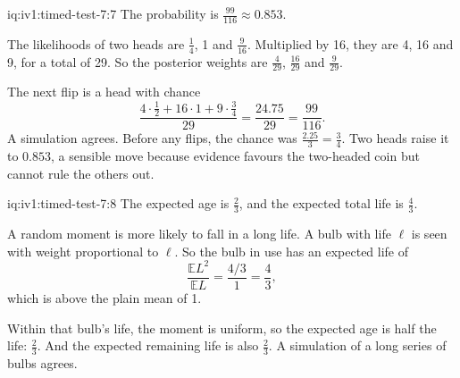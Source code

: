 \begin{solution}{iq:iv1:timed-test-7:7}
The probability is $\frac{99}{116} \approx 0.853$.

The likelihoods of two heads are $\frac14$, 1 and $\frac{9}{16}$. Multiplied by 16, they are 4, 16 and 9, for a total of 29. So the posterior weights are $\frac{4}{29}$, $\frac{16}{29}$ and $\frac{9}{29}$.

The next flip is a head with chance
\[
\frac{4 \cdot \frac12 + 16 \cdot 1 + 9 \cdot \frac34}{29} = \frac{24.75}{29} = \frac{99}{116}.
\]
A simulation agrees. Before any flips, the chance was $\frac{2.25}{3} = \frac34$. Two heads raise it to $0.853$, a sensible move because evidence favours the two-headed coin but cannot rule the others out.


\end{solution}

\enlargethispage{-4\baselineskip}%
\begin{solution}{iq:iv1:timed-test-7:8}
The expected age is $\frac23$, and the expected total life is $\frac43$.

A random moment is more likely to fall in a long life. A bulb with life $\ell$ is seen with weight proportional to $\ell$. So the bulb in use has an expected life of
\[
\frac{\mathbb{E}L^2}{\mathbb{E}L} = \frac{4/3}{1} = \frac43,
\]
which is above the plain mean of 1.

Within that bulb's life, the moment is uniform, so the expected age is half the life: $\frac23$. And the expected remaining life is also $\frac23$. A simulation of a long series of bulbs agrees.


\end{solution}


